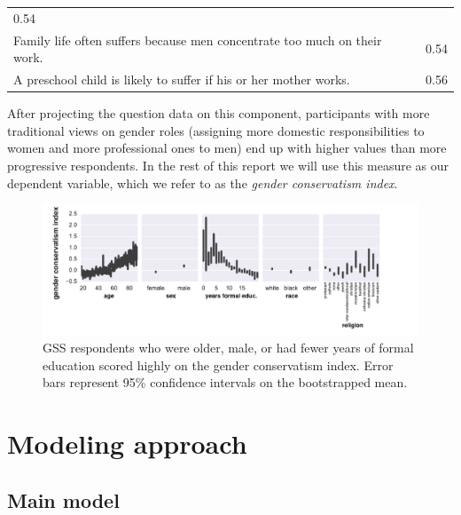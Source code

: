 \documentclass{article}
\begin{document}
\begin{longtable}[c]{@{}ll@{}}
\begin{minipage}[t]{0.2\columnwidth}
0.54
\strut\end{minipage}\tabularnewline
\begin{minipage}[t]{0.6\columnwidth}\raggedright\strut
Family life often suffers because men concentrate too much on their
work.
\strut\end{minipage} &
\begin{minipage}[t]{0.2\columnwidth}\raggedright\strut
0.54
\strut\end{minipage}\tabularnewline
\begin{minipage}[t]{0.6\columnwidth}\raggedright\strut
A preschool child is likely to suffer if his or her mother works.
\strut\end{minipage} &
\begin{minipage}[t]{0.2\columnwidth}\raggedright\strut
0.56
\strut\end{minipage}\tabularnewline
\bottomrule
\end{longtable}

 After projecting the question data on this component, participants with
more traditional views on gender roles (assigning more domestic
responsibilities to women and more professional ones to men) end up with
higher values than more progressive respondents. In the rest of this
report we will use this measure as our dependent variable, which we
refer to as the \emph{gender conservatism index}.


\begin{figure}[h!]
\begin{center}
\includegraphics[width=0.7\columnwidth]{figures/gci/gci}
\caption{GSS respondents who were older, male, or had fewer years of
formal education scored highly on the gender conservatism index. Error
bars represent 95\% confidence intervals on the bootstrapped mean.%
}
\end{center}
\end{figure}

\section{Modeling approach}\label{modeling-approach}

\subsection{Main model}\label{main-model}
\end{document}
